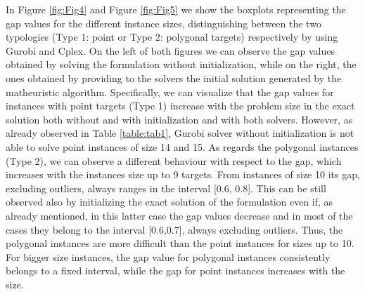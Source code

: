 \documentclass{itor}
\theoremstyle{definition}
\theoremstyle{remark}
\begin{document}
In Figure \ref{fig:Fig4} and Figure \ref{fig:Fig5} we show the boxplots representing the gap values for the different instance sizes, distinguishing between the two typologies (Type 1: point or Type 2: polygonal targets) respectively by using Gurobi and Cplex. On the left of both figures we can observe the gap values obtained by solving the formulation without initialization, while on the right, the ones obtained by providing to the solvers the initial solution generated by the matheuristic algorithm. 
Specifically, we can visualize that the gap values for instances with point targets (Type 1) increase with the problem size in the exact solution both without and with initialization and with both solvers. However, as already observed in Table \ref{table:tab1}, Gurobi solver without initialization is not able to solve point instances of size 14 and 15. As regards the polygonal instances (Type 2), we can observe a different behaviour with respect to the gap, which increases with the instances size up to 9 targets. From instances of size 10 its gap, excluding outliers, always ranges in the interval [0.6, 0.8]. This can be still observed also by initializing the exact solution of the formulation even if, as already mentioned, in this latter case the gap values decrease and in most of the cases they belong to the interval [0.6,0.7], always excluding outliers. Thus, the polygonal instances are more difficult than the point instances for sizes up to 10. For bigger size instances, the gap value for polygonal instances consistently belongs to a fixed interval, while the gap for point instances increases with the size. 
\end{document}
